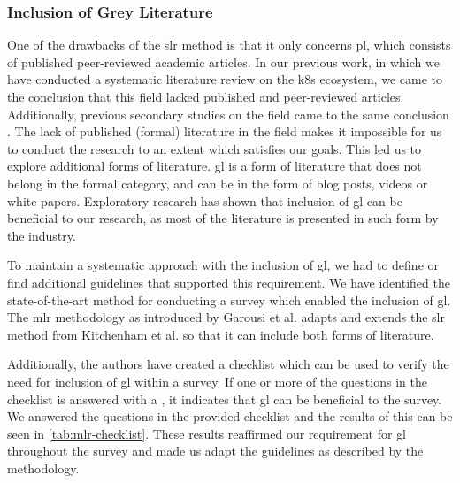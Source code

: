 \subsubsection{Inclusion of Grey Literature}
\label{sec:survey:methodology:strategy:gl}

One of the drawbacks of the \gls{slr} method is that it only concerns \gls{pl}, which consists of published peer-reviewed academic articles. In our previous work, in which we have conducted a systematic literature review on the \gls{k8s} ecosystem, we came to the conclusion that this field lacked published and peer-reviewed articles. Additionally, previous secondary studies on the field came to the same conclusion \cite{service-mesh-survey}. The lack of published (formal) literature in the field makes it impossible for us to conduct the research to an extent which satisfies our goals. This led us to explore additional forms of literature. \Gls{gl} is a form of literature that does not belong in the formal category, and can be in the form of blog posts, videos or white papers. Exploratory research has shown that inclusion of \gls{gl} can be beneficial to our research, as most of the literature is presented in such form by the industry.

To maintain a systematic approach with the inclusion of \gls{gl}, we had to define or find additional guidelines that supported this requirement. We have identified the state-of-the-art method for conducting a survey which enabled the inclusion of \gls{gl}. The \gls{mlr} methodology as introduced by Garousi et al. \cite{Garousi2019} adapts and extends the \gls{slr} method from Kitchenham et al. so that it can include both forms of literature. 



Additionally, the authors have created a checklist which can be used to verify the need for inclusion of \gls{gl} within a survey. If one or more of the questions in the checklist is answered with a , it indicates that \gls{gl} can be beneficial to the survey. We answered the questions in the provided checklist and the results of this can be seen in \cref{tab:mlr-checklist}. These results reaffirmed our requirement for \gls{gl} throughout the survey and made us adapt the guidelines as described by the methodology.




